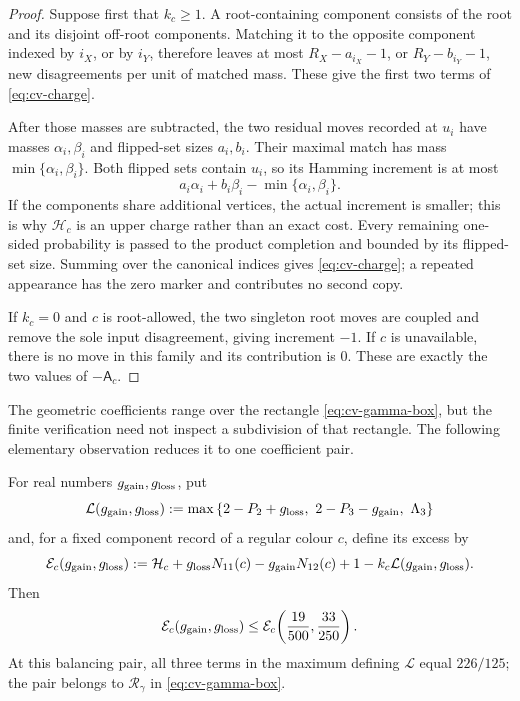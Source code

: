 \begin{proof}
Suppose first that \(k_c\ge1\).  A root-containing component consists of
the root and its disjoint off-root components.  Matching it to the
opposite component indexed by \(i_X\), or by \(i_Y\), therefore leaves at
most \(R_X-a_{i_X}-1\), or \(R_Y-b_{i_Y}-1\), new disagreements per unit
of matched mass.  These give the first two terms of
\eqref{eq:cv-charge}.

After those masses are subtracted, the two residual moves recorded at
\(u_i\) have masses \(\alpha_i,\beta_i\) and flipped-set sizes
\(a_i,b_i\).  Their maximal match has mass
\(\min\{\alpha_i,\beta_i\}\).  Both flipped sets contain \(u_i\), so its
Hamming increment is at most
\[
 a_i\alpha_i+b_i\beta_i-\min\{\alpha_i,\beta_i\}.
\]
If the components share additional vertices, the actual increment is
smaller; this is why \(\mathcal H_c\) is an upper charge rather than an
exact cost.  Every remaining one-sided probability is passed to the
product completion and bounded by its flipped-set size.  Summing over the
canonical indices gives \eqref{eq:cv-charge}; a repeated appearance has
the zero marker and contributes no second copy.

If \(k_c=0\) and \(c\) is root-allowed, the two singleton root
moves are coupled and remove the sole input disagreement, giving
increment \(-1\).  If \(c\) is unavailable, there is no move in this
family and its contribution is \(0\).  These are exactly the two values
of \(-\mathsf A_c\).
\end{proof}

The geometric coefficients range over the rectangle
\eqref{eq:cv-gamma-box}, but the finite verification need not inspect a
subdivision of that rectangle.  The following elementary observation
reduces it to one coefficient pair.

\begin{lemma}\label{lem:cv-balancing-domination}
For real numbers $g_{\rm gain},g_{\rm loss}$, put
\[
 \mathcal L(g_{\rm gain},g_{\rm loss}):=
 \max\left\{2-P_2+g_{\rm loss},\ 2-P_3-g_{\rm gain},\ \Lambda_3\right\}
\]
and, for a fixed component record of a regular colour \(c\), define its
excess by
\[
 \mathcal E_c(g_{\rm gain},g_{\rm loss}):=
 \mathcal H_c+g_{\rm loss}N_{11}(c)-g_{\rm gain}N_{12}(c)
       +1-k_c\mathcal L(g_{\rm gain},g_{\rm loss}).
\]
Then
\[
 \mathcal E_c(g_{\rm gain},g_{\rm loss})
 \le \mathcal E_c\!\left(\frac{19}{500},\frac{33}{250}\right).
\]
At this balancing pair, all three terms in the maximum defining
$\mathcal L$ equal $226/125$; the pair belongs to
$\mathcal R_\gamma$ in \eqref{eq:cv-gamma-box}.
\end{lemma}

